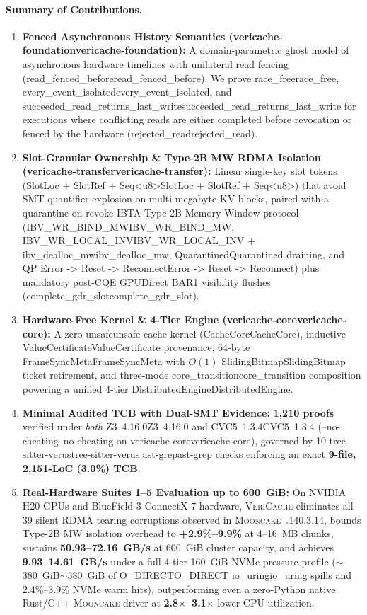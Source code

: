 \documentclass[11pt,a4paper]{article}
\let\origunderscore\_
\DeclareRobustCommand{\code}[1]{{\ttfamily\ifmmode #1\else\def\_{\origunderscore\hspace{0pt}}#1\fi}}
\newcommand{\VC}{\textsc{VeriCache}}
\newcommand{\MC}{\textsc{Mooncake}}
\begin{document}
\paragraph{Summary of Contributions.}
\begin{enumerate}
  \item \textbf{Fenced Asynchronous History Semantics (\code{vericache-foundation}):} A domain-parametric ghost model of asynchronous hardware timelines with unilateral read fencing (\code{read\_fenced\_before}). We prove \code{race\_free}, \code{every\_event\_isolated}, and \code{succeeded\_read\_returns\_last\_write} for executions where conflicting reads are either completed before revocation or fenced by the hardware (\code{rejected\_read}).
  \item \textbf{Slot-Granular Ownership \& Type-2B MW RDMA Isolation (\code{vericache-transfer}):} Linear single-key slot tokens (\code{SlotLoc + SlotRef + Seq<u8>}) that avoid SMT quantifier explosion on multi-megabyte KV blocks, paired with a quarantine-on-revoke IBTA Type-2B Memory Window protocol (\code{IBV\_WR\_BIND\_MW}, \code{IBV\_WR\_LOCAL\_INV} + \code{ibv\_dealloc\_mw}, \code{Quarantined} draining, and QP \code{Error -> Reset -> Reconnect}) plus mandatory post-CQE GPUDirect BAR1 visibility flushes (\code{complete\_gdr\_slot}).
  \item \textbf{Hardware-Free Kernel \& 4-Tier Engine (\code{vericache-core}):} A zero-\code{unsafe} cache kernel (\code{CacheCore}), inductive \code{ValueCertificate} provenance, 64-byte \code{FrameSyncMeta} with $O(1)$ \code{SlidingBitmap} ticket retirement, and three-mode \code{core\_transition} composition powering a unified 4-tier \code{DistributedEngine}.
  \item \textbf{Minimal Audited TCB with Dual-SMT Evidence:} \textbf{1,210 proofs} verified under \emph{both} \code{Z3~4.16.0} and \code{CVC5~1.3.4} (\code{--no-cheating} on \code{vericache-core}), governed by 10 \code{tree-sitter-verus} \code{ast-grep} checks enforcing an exact \textbf{9-file, 2,151-LoC (3.0\%) TCB}.
  \item \textbf{Real-Hardware Suites 1--5 Evaluation up to 600~GiB:} On NVIDIA H20 GPUs and BlueField-3 ConnectX-7 hardware, \VC{} eliminates all 39 silent RDMA tearing corruptions observed in \MC{}~\code{0.3.14}, bounds Type-2B MW isolation overhead to \textbf{+2.9\%--9.9\%} at 4--16~MB chunks, sustains \textbf{50.93--72.16~GB/s} at 600~GiB cluster capacity, and achieves \textbf{9.93--14.61~GB/s} under a full 4-tier 160~GiB NVMe-pressure profile (\code{$\sim$380~GiB} of \code{O\_DIRECT} \code{io\_uring} spills and 2.4\%--3.9\% NVMe warm hits), outperforming even a zero-Python native Rust/C++ \MC{} driver at \textbf{2.8$\times$--3.1$\times$} lower CPU utilization.
\end{enumerate}
\end{document}

